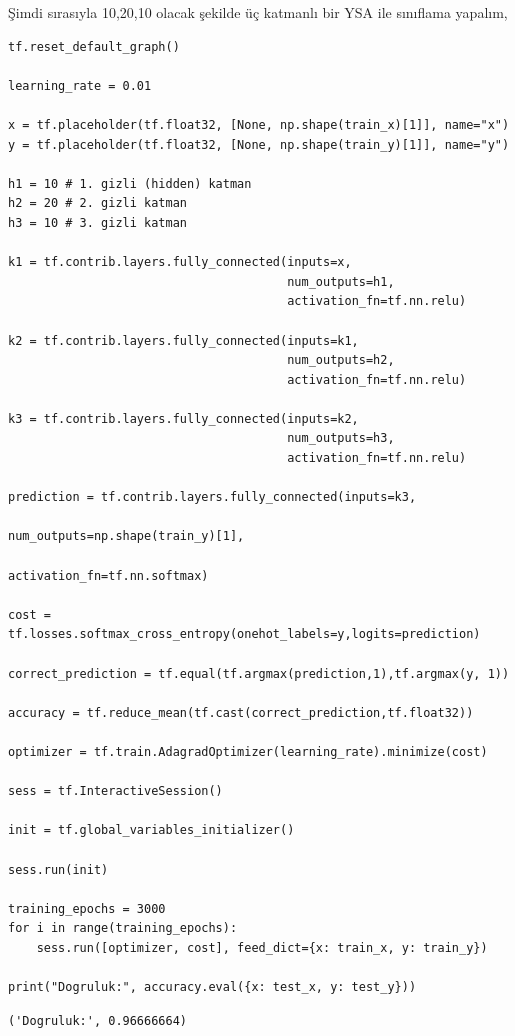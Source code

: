 \documentclass[12pt,fleqn]{article}\usepackage{../../common}
\begin{document}
Şimdi sırasıyla 10,20,10 olacak şekilde üç katmanlı bir YSA ile sınıflama
yapalım,

\begin{verbatim}
tf.reset_default_graph()

learning_rate = 0.01

x = tf.placeholder(tf.float32, [None, np.shape(train_x)[1]], name="x")
y = tf.placeholder(tf.float32, [None, np.shape(train_y)[1]], name="y")

h1 = 10 # 1. gizli (hidden) katman
h2 = 20 # 2. gizli katman
h3 = 10 # 3. gizli katman

k1 = tf.contrib.layers.fully_connected(inputs=x,
                                       num_outputs=h1, 
                                       activation_fn=tf.nn.relu)

k2 = tf.contrib.layers.fully_connected(inputs=k1,
                                       num_outputs=h2, 
                                       activation_fn=tf.nn.relu)

k3 = tf.contrib.layers.fully_connected(inputs=k2,
                                       num_outputs=h3, 
                                       activation_fn=tf.nn.relu)

prediction = tf.contrib.layers.fully_connected(inputs=k3,
                                               num_outputs=np.shape(train_y)[1], 
                                               activation_fn=tf.nn.softmax)

cost = tf.losses.softmax_cross_entropy(onehot_labels=y,logits=prediction)

correct_prediction = tf.equal(tf.argmax(prediction,1),tf.argmax(y, 1))

accuracy = tf.reduce_mean(tf.cast(correct_prediction,tf.float32))

optimizer = tf.train.AdagradOptimizer(learning_rate).minimize(cost)

sess = tf.InteractiveSession()

init = tf.global_variables_initializer()

sess.run(init)

training_epochs = 3000
for i in range(training_epochs):
    sess.run([optimizer, cost], feed_dict={x: train_x, y: train_y})

print("Dogruluk:", accuracy.eval({x: test_x, y: test_y}))    
\end{verbatim}

\begin{verbatim}
('Dogruluk:', 0.96666664)
\end{verbatim}
\end{document}
